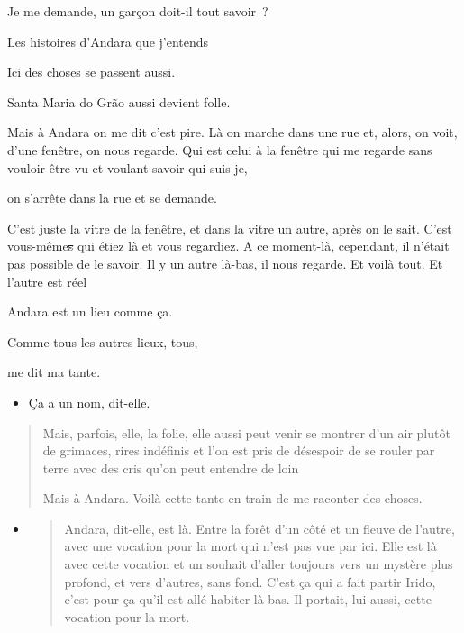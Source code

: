 Je me demande, un garçon doit-il tout savoir~?

Les histoires d'Andara que j'entends

Ici des choses se passent aussi.

Santa Maria do Grão aussi devient folle.

Mais à Andara on me dit c'est pire. Là on marche dans une rue et, alors,
on voit, d'une fenêtre, on nous regarde. Qui est celui à la fenêtre qui
me regarde sans vouloir être vu et voulant savoir qui suis-je,

on s'arrête dans la rue et se demande.

C'est juste la vitre de la fenêtre, et dans la vitre un autre, après on
le sait. C'est vous-même\sout{s} qui étiez là et vous regardiez. A ce
moment-là, cependant, il n'était pas possible de le savoir. Il y un
autre là-bas, il nous regarde. Et voilà tout. Et l'autre est réel

Andara est un lieu comme ça.

Comme tous les autres lieux, tous,

me dit ma tante.

\begin{itemize}
\item
  Ça a un nom, dit-elle.
\end{itemize}

\begin{quote}
Mais, parfois, elle, la folie, elle aussi peut venir se montrer d'un air
plutôt de grimaces, rires indéfinis et l'on est pris de désespoir de se
rouler par terre avec des cris qu'on peut entendre de loin

Mais à Andara. Voilà cette tante en train de me raconter des choses.
\end{quote}

\begin{itemize}
\item
  \begin{quote}
  Andara, dit-elle, est là. Entre la forêt d'un côté et un fleuve de
  l'autre, avec une vocation pour la mort qui n'est pas vue par ici.
  Elle est là avec cette vocation et un souhait d'aller toujours vers un
  mystère plus profond, et vers d'autres, sans fond. C'est ça qui a fait
  partir Irido, c'est pour ça qu'il est allé habiter là-bas. Il portait,
  lui-aussi, cette vocation pour la mort.
  \end{quote}
\end{itemize}

